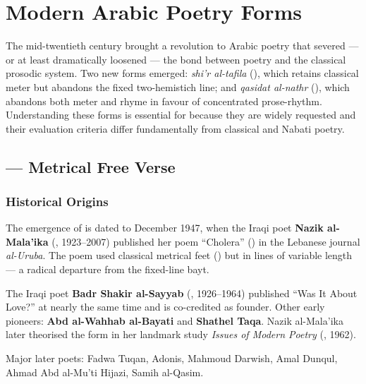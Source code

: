 \chapter{Modern Arabic Poetry Forms}
\label{ch:modern}

The mid-twentieth century brought a revolution to Arabic poetry that severed — or at least dramatically loosened — the bond between poetry and the classical prosodic system. Two new forms emerged: \textit{shi'r al-tafila} (), which retains classical meter but abandons the fixed two-hemistich line; and \textit{qasidat al-nathr} (), which abandons both meter and rhyme in favour of concentrated prose-rhythm. Understanding these forms is essential for \poeteng{} because they are widely requested and their evaluation criteria differ fundamentally from classical and Nabati poetry.

\section{ — Metrical Free Verse}
\label{sec:tafila}

\subsection{Historical Origins}

The emergence of  is dated to December 1947, when the Iraqi poet \textbf{Nazik al-Mala'ika} (, 1923–2007) published her poem ``Cholera'' () in the Lebanese journal \textit{al-Uruba}. The poem used classical metrical feet () but in lines of variable length — a radical departure from the fixed-line bayt.

The Iraqi poet \textbf{Badr Shakir al-Sayyab} (, 1926–1964) published ``Was It About Love?'' at nearly the same time and is co-credited as founder. Other early pioneers: \textbf{Abd al-Wahhab al-Bayati} and \textbf{Shathel Taqa}. Nazik al-Mala'ika later theorised the form in her landmark study \textit{Issues of Modern Poetry} (, 1962).

Major later poets: Fadwa Tuqan, Adonis, Mahmoud Darwish, Amal Dunqul, Ahmad Abd al-Mu'ti Hijazi, Samih al-Qasim.


